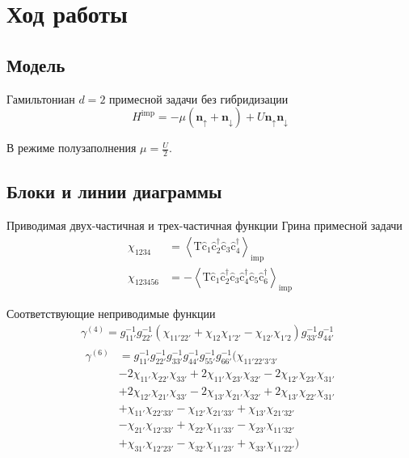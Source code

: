 \documentclass[11pt,a4paper]{report}
\begin{document}
\chapter{Ход работы}

\section{Модель}

Гамильтониан $d=2$ примесной задачи без гибридизации
\begin{equation}
\label{hamil}
 H^{\text{imp}} = -\mu(\mathbf{n}_\uparrow+\mathbf{n}_\downarrow) + U\mathbf{n}_\uparrow\mathbf{n}_\downarrow
\end{equation}

В режиме полузаполнения $\mu = \frac{U}{2}$.

\section{Блоки и линии диаграммы}

Приводимая двух-частичная и трех-частичная функции Грина примесной задачи
\begin{equation}
\begin{split}
\chi_{1234} &= \left<\mathrm{T}\hat{\mathrm{c}}_1\hat{\mathrm{c}}^\dagger_2\hat{\mathrm{c}}_3\hat{\mathrm{c}}^\dagger_4\right>_\text{imp} \\
\chi_{123456} &= -\left<\mathrm{T}\hat{\mathrm{c}}_1\hat{\mathrm{c}}^\dagger_2\hat{\mathrm{c}}_3\hat{\mathrm{c}}^\dagger_4\hat{\mathrm{c}}_5\hat{\mathrm{c}}^\dagger_6\right>_\text{imp}
\end{split}
\end{equation}

Соответствующие неприводимые функции
\begin{equation}
\begin{split}
\gamma^{(4)} = g_{11'}^{-1}g_{22'}^{-1}\left(\chi_{11'22'}+\chi_{12}\chi_{1'2'}-\chi_{12'}\chi_{1'2}\right)g_{33'}^{-1}g_{44'}^{-1}
\\
\begin{aligned}
\gamma^{(6)} & =  g_{11'}^{-1}g_{22'}^{-1} g_{33'}^{-1}g_{44'}^{-1} g_{55'}^{-1}g_{66'}^{-1} ( \chi_{11'22'3'3'} \\
& -2 \chi_{11'} \chi_{22'} \chi_{33'} 
+2 \chi_{11'} \chi_{23'} \chi_{32'}
-2 \chi_{12'} \chi_{23'} \chi_{31'} \\ 
& +2 \chi_{12'} \chi_{21'} \chi_{33'}
-2 \chi_{13'} \chi_{21'} \chi_{32'}
+2 \chi_{13'} \chi_{22'} \chi_{31'} \\
& +\chi_{11'} \chi_{22'33'}
-\chi_{12'} \chi_{21'33'}
+\chi_{13'} \chi_{21'32'} \\
& -\chi_{21'} \chi_{12'33'}
+\chi_{22'} \chi_{11'33'}
-\chi_{23'} \chi_{11'32'} \\
& +\chi_{31'} \chi_{12'23'}
-\chi_{32'} \chi_{11'23'}
+\chi_{33'} \chi_{11'22'}
)
\end{aligned}
\end{split}
\end{equation}
\end{document}
